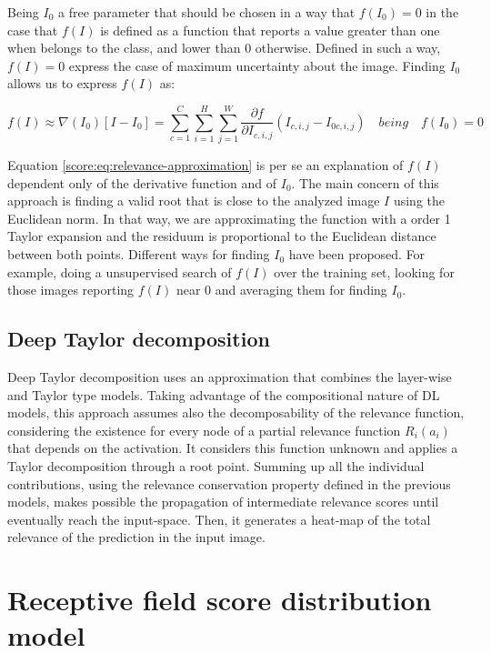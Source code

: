 Being $I_0$ a free parameter that should be chosen in a way that $f(I_0) = 0$ in the case that $f(I)$ is defined as a function that reports a value greater than one when belongs to the class, and lower than 0 otherwise. Defined in such a way, $f(I) = 0$ express the case of maximum uncertainty about the image. Finding $I_0$ allows us to express $f(I)$ as:

\begin{equation}
f(I) \approx \nabla(I_0) [ I - I_0] = \sum_{c=1}^C \sum_{i=1}^{H} \sum_{j=1}^W \frac{\partial f}{\partial I_{c,i,j}}(I_{c,i,j} - I_{0 c, i, j}) \quad  being \quad f(I_0) = 0
\label{score:eq:relevance-approximation}
\end{equation}

Equation \ref{score:eq:relevance-approximation} is per se an explanation of $f(I)$ dependent only of the derivative function and of $I_0$. The main concern of this approach is finding a valid root that is close to the analyzed image $I$ using the Euclidean norm. In that way, we are approximating the function with a order 1 Taylor expansion and the residuum is proportional to the Euclidean distance between both points. Different ways for finding $I_0$ have been proposed. For example, doing a unsupervised search of $f(I)$ over the training set, looking for those images reporting $f(I)$ near 0 and averaging them for finding $I_0$.

\subsection{Deep Taylor decomposition}

Deep Taylor decomposition \citep{montavon2017explaining} uses an approximation that combines the layer-wise and Taylor type models. Taking advantage of the compositional nature of DL models, this approach assumes also the decomposability of the relevance function, considering the existence for every node of a partial relevance function $R_i(a_i)$ that depends on the activation. It considers this function unknown and applies a Taylor decomposition through a root point. Summing up all the individual contributions, using the relevance conservation property defined in the previous models, makes possible the propagation of intermediate relevance scores until eventually reach the input-space. Then, it generates a heat-map of the total relevance of the prediction in the input image. 

\section{Receptive field score distribution model} \label{score:sec:math}

